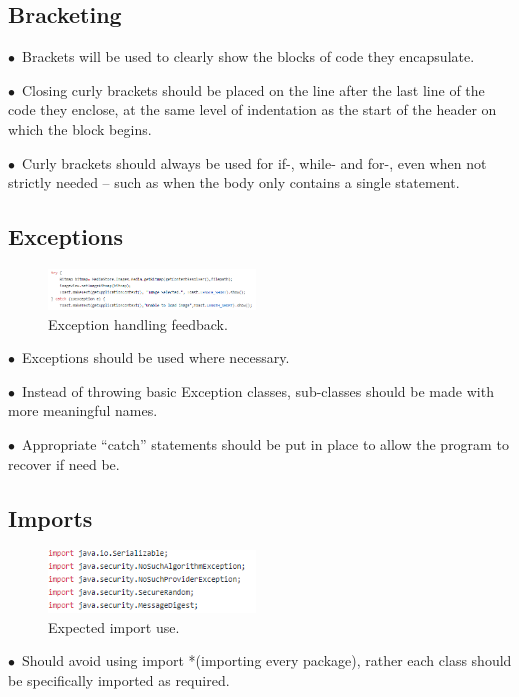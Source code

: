 \documentclass[english]{article}
\begin{document}
				\subsection{Bracketing}
$\bullet$\ Brackets will be used to clearly show the blocks of code they encapsulate.\par
$\bullet$\ Closing curly brackets should be placed on the line after the last line of the code they enclose, at the same level of indentation as the start of the header on which the block begins. \par
$\bullet$\ Curly brackets should always be used for if-, while- and for-, even when not strictly needed – such as when the body only contains a single statement.\par
\newpage
\subsection{Exceptions}
\begin{figure}
	\caption{Exception handling feedback.}
	\label{wrap-fig:2}
	\includegraphics[width=5.5cm]{images/exception.png}
\end{figure} 
$\bullet$\ Exceptions should be used where necessary.\par
$\bullet$\ Instead of throwing basic Exception classes, sub-classes should be made with more meaningful names.\par
$\bullet$\ Appropriate “catch” statements should be put in place to allow the program to recover if need be.\par




\subsection{Imports}
\begin{figure}
	\caption{Expected import use.}
	\label{wrap-fig:3}
	\includegraphics[width=5.5cm]{images/imports.png}
\end{figure} 
$\bullet$\ Should avoid using import *(importing every package), rather each class should be specifically imported as required.\par
\end{document}

